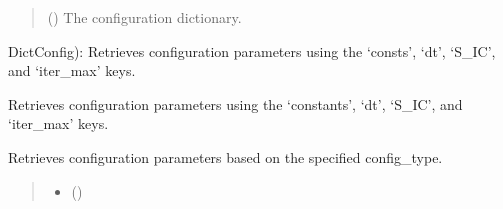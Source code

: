 \documentclass[a4paper,11pt,english,openany]{sphinxmanual}
\begin{document}
\begin{fulllineitems}
\begin{fulllineitems}
\begin{quote}
\begin{description}
\sphinxAtStartPar
{} () \textendash{} The configuration dictionary.

\end{description}\end{quote}


\begin{fulllineitems}

\pysigstartsignatures
{}
\pysigstopsignatures
\sphinxAtStartPar
DictConfig): Retrieves configuration parameters using the ‘consts’, ‘dt’, ‘S\_IC’, and ‘iter\_max’ keys.

\end{fulllineitems}


\begin{fulllineitems}
\label{\detokenize{api/spyice.utils.config_sort:id0}}
\pysigstartsignatures
{}
\pysigstopsignatures
\sphinxAtStartPar
Retrieves configuration parameters using the ‘constants’, ‘dt’, ‘S\_IC’, and ‘iter\_max’ keys.

\end{fulllineitems}


\begin{fulllineitems}
\label{\detokenize{api/spyice.utils.config_sort:id1}}
\pysigstartsignatures
{}
\pysigstopsignatures
\sphinxAtStartPar
Retrieves configuration parameters based on the specified config\_type.
\begin{quote}\begin{description}
\begin{itemize}
\item {} 
\sphinxAtStartPar
{} ()


\end{itemize}
\end{description}
\end{quote}
\end{fulllineitems}
\end{fulllineitems}
\end{fulllineitems}
\end{document}
